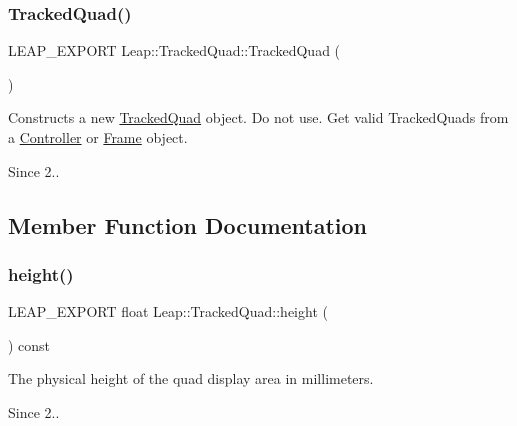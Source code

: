 \subsubsection{\texorpdfstring{Tracked\+Quad()}{TrackedQuad()}}
{\footnotesize\ttfamily L\+E\+A\+P\+\_\+\+E\+X\+P\+O\+RT Leap\+::\+Tracked\+Quad\+::\+Tracked\+Quad (\begin{DoxyParamCaption}{ }\end{DoxyParamCaption})}

Constructs a new \hyperlink{class_leap_1_1_tracked_quad}{Tracked\+Quad} object. Do not use. Get valid Tracked\+Quads from a \hyperlink{class_leap_1_1_controller}{Controller} or \hyperlink{class_leap_1_1_frame}{Frame} object. 
\begin{DoxyCodeInclude}
\end{DoxyCodeInclude}
 
\begin{DoxyCodeInclude}
\end{DoxyCodeInclude}
 \begin{DoxySince}{Since}
2.. 
\end{DoxySince}


\subsection{Member Function Documentation}
\mbox{\label{class_leap_1_1_tracked_quad_abce390c8b28040de3062cddfcf2c532a}} 
\subsubsection{\texorpdfstring{height()}{height()}}
{\footnotesize\ttfamily L\+E\+A\+P\+\_\+\+E\+X\+P\+O\+RT float Leap\+::\+Tracked\+Quad\+::height (\begin{DoxyParamCaption}{ }\end{DoxyParamCaption}) const}

The physical height of the quad display area in millimeters. 
\begin{DoxyCodeInclude}
\end{DoxyCodeInclude}
 \begin{DoxySince}{Since}
2.. 
\end{DoxySince}
\mbox{\label{class_leap_1_1_tracked_quad_ae0d15342d6e8ce286d137feb971d0a50}} 
